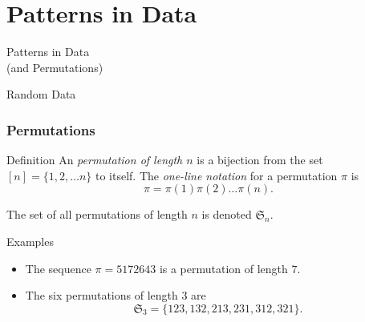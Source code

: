 \documentclass[xcolor=table,dvipsnames]{beamer}
\renewcommand{\S}{\mathfrak{S}}
\begin{document}
  \section{Patterns in Data}
  \begin{frame}
    \centering
    \Large \color{teal} Patterns in Data \\{\large (and Permutations)}
  \end{frame}

  \begin{frame}{Random Data}
    \begin{center}
    \end{center}
  \end{frame}

  \begin{frame} \frametitle{Permutations}
    \pause
    \begin{block}{Definition}
      An \emph{permutation of length $n$} is a bijection from the set $[n] = \{1,
      2, \dots n\}$ to itself. The \emph{one-line notation} for a permutation
      $\pi$ is 
      $$ \pi = \pi(1) \pi(2) \dots \pi(n). $$

      The set of all permutations of length $n$ is denoted $\S_n$. 
    \end{block}
    \pause
    \vspace{1pc}

    \begin{center}
    \begin{block}{Examples}
      \begin{itemize}
        \item The sequence $\pi = 5172643$ is a permutation of length $7$. 
        \pause
        \item The six permutations of length $3$ are 
          $$ \S_3 = \{123, 132, 213, 231, 312, 321\}. $$
      \end{itemize}
    \end{block}
    \end{center}
  \end{frame}
\end{document}
